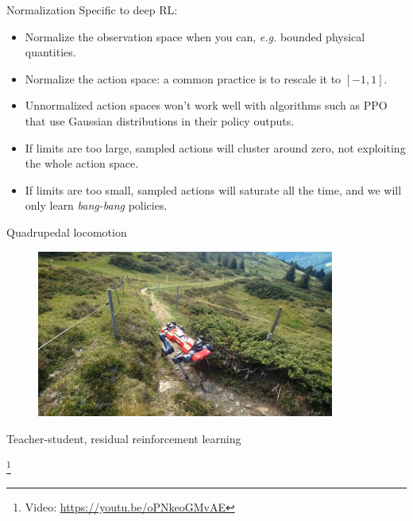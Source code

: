 \documentclass[11pt, aspectratio=169]{beamer}
\newcommand\blfootnote[1]{%
  \begingroup
  \renewcommand\thefootnote{}%
  \footnote{#1}%
  \addtocounter{footnote}{-1}%
  \endgroup
}
\begin{document}
\begin{frame}{Normalization}
    Specific to deep RL:
    \begin{itemize}
        \item Normalize the observation space when you can, \emph{e.g.} bounded physical quantities.
        \item Normalize the action space: a common practice is to rescale it to $[-1, 1]$.
        \item Unnormalized action spaces won't work well with algorithms such as PPO that use Gaussian distributions in their policy outputs.
        \item If limits are too large, sampled actions will cluster around zero, not exploiting the whole action space.
        \item If limits are too small, sampled actions will saturate all the time, and we will only learn \emph{bang-bang} policies.
    \end{itemize}
\end{frame}

\begin{frame}{Quadrupedal locomotion~\cite{lee2020}}
    \vspace{1.5em}
    \begin{figure}
        \includegraphics[height=5.5cm]{figures/hike-with-anymal.jpg}
    \end{figure}
    \begin{center}
        Teacher-student, residual reinforcement learning
    \end{center}
    \blfootnote{
        Video: \url{https://youtu.be/oPNkeoGMvAE}
    }
\end{frame}
\end{document}
